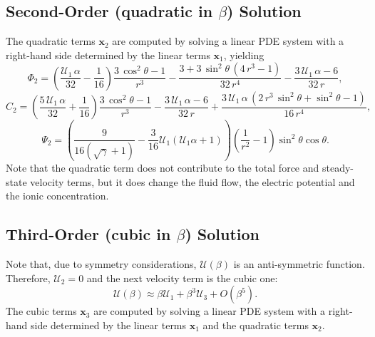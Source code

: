 \documentclass[preprint,10pt]{elsarticle}
\newcommand{\pars}[1]{\left(#1\right)}
\newcommand\bx{\boldsymbol{x}}
\newcommand\cU{\mathscr{U}}
\begin{document}
\subsection{Second-Order (quadratic in $\beta$) Solution} \label{app:quadratic}
The quadratic terms $\bx_2$ are computed by solving a linear PDE system 
with a right-hand side determined by the linear terms $\bx_1$, yielding
\begin{equation}
\varPhi_2 = \pars{\frac{\cU_1\, \alpha}{32} - \frac{1}{16}}
\frac{3\, {\cos^2\theta} - 1}{r^3} - \frac{3 + 3\, {\sin^2\theta}\, \left(4\, r^3 - 1\right)}{32\, r^4} - \frac{3\, \cU_1\, \alpha - 6}{32\, r},
\end{equation}
\begin{equation}
C_2 = \left(\frac{5\, \cU_1\, \alpha}{32} + \frac{1}{16}\right)
\frac{3\, {\cos^2\theta} - 1}{r^3} - \frac{3\, \cU_1\, \alpha - 6}{32\, r} + \frac{3\, \cU_1\, \alpha\, \left(2\, r^3\, {\sin^2\theta} + {\sin^2\theta} - 1\right)}{16\, r^4},
\end{equation}
\begin{equation}
\Psi_2 = \pars{\frac{9}{16(\sqrt{\gamma}+1)} - \frac{3}{16} \cU_1 (\cU_1 \alpha + 1)}
 \left(\frac{1}{r^2} - 1\right) \sin^2\theta \cos\theta.
\end{equation}
Note that the quadratic term does not contribute to the total force and steady-state 
velocity terms, but it does change the fluid flow, 
the electric potential and the ionic concentration.

\subsection{Third-Order (cubic in $\beta$) Solution} \label{app:cubic}
Note that, due to symmetry considerations, $\cU(\beta)$ is an anti-symmetric function.
Therefore, $\cU_2 = 0$ and the next velocity term is the cubic one:
\begin{equation} \label{eq:cubic}
\cU(\beta) \approx \beta \cU_1 + \beta^3 \cU_3 + O(\beta^5).
\end{equation}
The cubic terms $\bx_3$ are computed by solving a linear PDE system 
with a right-hand side determined by the linear terms $\bx_1$ and the quadratic terms $\bx_2$.
\end{document}
